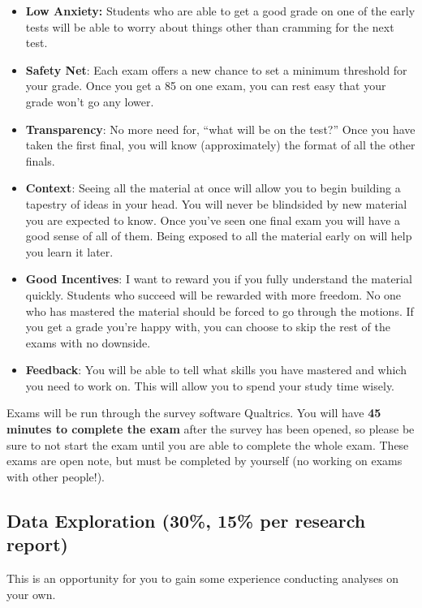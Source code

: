 \documentclass[
]{book}
\providecommand{\tightlist}{%
  \setlength{\itemsep}{0pt}\setlength{\parskip}{0pt}}
\begin{document}
\begin{itemize}
\tightlist
\item
  \textbf{Low Anxiety:} Students who are able to get a good grade on one of the early tests will be able to worry about things other than cramming for the next test.
\item
  \textbf{Safety Net}: Each exam offers a new chance to set a minimum threshold for your grade. Once you get a 85 on one exam, you can rest easy that your grade won't go any lower.
\item
  \textbf{Transparency}: No more need for, ``what will be on the test?'' Once you have taken the first final, you will know (approximately) the format of all the other finals.
\item
  \textbf{Context}: Seeing all the material at once will allow you to begin building a tapestry of ideas in your head. You will never be blindsided by new material you are expected to know. Once you've seen one final exam you will have a good sense of all of them. Being exposed to all the material early on will help you learn it later.
\item
  \textbf{Good Incentives}: I want to reward you if you fully understand the material quickly. Students who succeed will be rewarded with more freedom. No one who has mastered the material should be forced to go through the motions. If you get a grade you're happy with, you can choose to skip the rest of the exams with no downside.
\item
  \textbf{Feedback}: You will be able to tell what skills you have mastered and which you need to work on. This will allow you to spend your study time wisely.
\end{itemize}

Exams will be run through the survey software Qualtrics. You will have \textbf{45 minutes to complete the exam} after the survey has been opened, so please be sure to not start the exam until you are able to complete the whole exam. These exams are open note, but must be completed by yourself (no working on exams with other people!).

\hypertarget{data-exploration-30-15-per-research-report}{%
\subsection{Data Exploration (30\%, 15\% per research report)}\label{data-exploration-30-15-per-research-report}}

This is an opportunity for you to gain some experience conducting analyses on your own.
\end{document}
